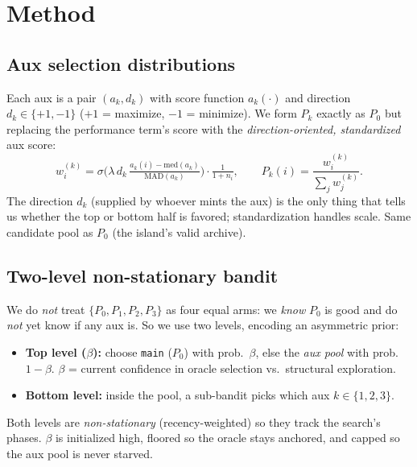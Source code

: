 \documentclass[11pt]{article}
\newcommand{\code}[1]{\texttt{\small #1}}
\begin{document}
\section{Method}

\subsection{Aux selection distributions}
Each aux is a pair $(a_k, d_k)$ with score function $a_k(\cdot)$ and direction $d_k\in\{+1,-1\}$
($+1$ = maximize, $-1$ = minimize). We form $P_k$ exactly as $P_0$ but replacing the performance
term's score with the \emph{direction-oriented, standardized} aux score:
\[
 w_i^{(k)} = \sigma\!\Big(\lambda\, d_k\,\tfrac{a_k(i)-\mathrm{med}(a_k)}{\mathrm{MAD}(a_k)}\Big)\cdot\tfrac{1}{1+n_i},
 \qquad P_k(i)=\frac{w_i^{(k)}}{\sum_j w_j^{(k)}}.
\]
The direction $d_k$ (supplied by whoever mints the aux) is the only thing that tells us whether the
top or bottom half is favored; standardization handles scale. Same candidate pool as $P_0$ (the
island's valid archive).

\subsection{Two-level non-stationary bandit}
We do \emph{not} treat $\{P_0,P_1,P_2,P_3\}$ as four equal arms: we \emph{know} $P_0$ is good and do
\emph{not} yet know if any aux is. So we use two levels, encoding an asymmetric prior:
\begin{itemize}[nosep]
  \item \textbf{Top level ($\beta$):} choose \code{main} ($P_0$) with prob.\ $\beta$, else the
        \emph{aux pool} with prob.\ $1-\beta$. $\beta$ = current confidence in oracle selection vs.\
        structural exploration.
  \item \textbf{Bottom level:} inside the pool, a sub-bandit picks which aux $k\in\{1,2,3\}$.
\end{itemize}
Both levels are \emph{non-stationary} (recency-weighted) so they track the search's phases. $\beta$ is
initialized high, floored so the oracle stays anchored, and capped so the aux pool is never starved.
\end{document}
